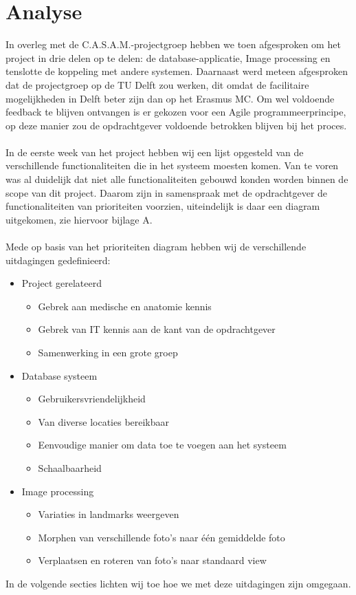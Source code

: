\section{Analyse}
In overleg met de C.A.S.A.M.-projectgroep hebben we toen afgesproken om het project in drie delen op te delen: de database-applicatie, Image processing en tenslotte de koppeling met andere systemen. 
Daarnaast werd meteen afgesproken dat de projectgroep op de TU Delft zou werken, dit omdat de facilitaire mogelijkheden in Delft beter zijn dan op het Erasmus MC. 
Om wel voldoende feedback te blijven ontvangen is er gekozen voor een Agile programmeerprincipe, op deze manier zou de opdrachtgever voldoende betrokken blijven bij het proces.
\\
\\
In de eerste week van het project hebben wij een lijst opgesteld van de verschillende functionaliteiten die in het systeem moesten komen. 
Van te voren was al duidelijk dat niet alle functionaliteiten gebouwd konden worden binnen de scope van dit project. 
Daarom zijn in samenspraak met de opdrachtgever de functionaliteiten van prioriteiten voorzien, uiteindelijk is daar een diagram uitgekomen, zie hiervoor bijlage A.
\\
\\
Mede op basis van het prioriteiten diagram hebben wij de verschillende uitdagingen gedefinieerd:
\begin{itemize}
  \item Project gerelateerd
  \begin{itemize}
    \item Gebrek aan medische en anatomie kennis
    \item Gebrek van IT kennis aan de kant van de opdrachtgever
    \item Samenwerking in een grote groep
  \end{itemize}
  \item Database systeem
  \begin{itemize}
    \item Gebruikersvriendelijkheid
    \item Van diverse locaties bereikbaar
    \item Eenvoudige manier om data toe te voegen aan het systeem
    \item Schaalbaarheid
  \end{itemize}
  \item Image processing
  \begin{itemize}
    \item Variaties in landmarks weergeven
    \item Morphen van verschillende foto's naar \'{e}\'{e}n gemiddelde foto
    \item Verplaatsen en roteren van foto's naar standaard view
  \end{itemize}
\end{itemize}
In de volgende secties lichten wij toe hoe we met deze uitdagingen zijn omgegaan.
